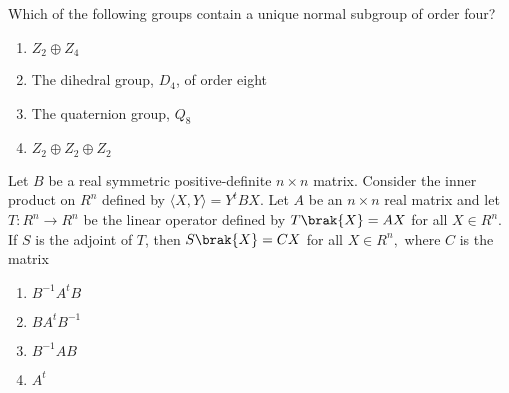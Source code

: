     \item Which of the following groups contain a unique normal subgroup of order four?
            \begin{enumerate}
                \item $Z_2\oplus Z_4$
                \item The dihedral group, $D_4$, of order eight
                \item The quaternion group, $Q_8$
                \item $Z_2\oplus Z_2\oplus Z_2$
            \end{enumerate}
    \item Let $B$ be a real symmetric positive-definite  $n\times n$ matrix. Consider the inner product on $R^n$ defined by $\langle X,Y\rangle=Y^t BX$. Let $A$ be an $n\times n$ real matrix and let $T\colon R^n\to R^n$ be the linear operator defined by $T\brak{X}=AX$ for all $X\in R^n$. If $S$ is the adjoint of $T$, then $S\brak{X}=CX$ for all $X\in R^n,$ where $C$ is the matrix
    \begin{enumerate}
        \item $B^{-1}A^t B$
        \item $BA^tB^{-1}$
        \item $B^{-1}AB$
        \item $A^t$
    \end{enumerate}
